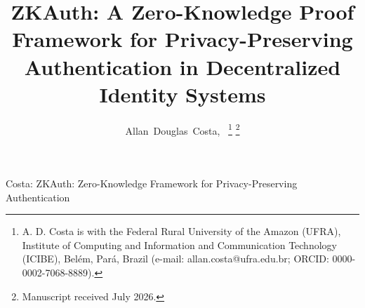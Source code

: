 \documentclass[journal,12pt,onecolumn]{IEEEtran}
\begin{document}

\title{ZKAuth: A Zero-Knowledge Proof Framework for
Privacy-Preserving Authentication in Decentralized Identity Systems}

\author{Allan~Douglas~Costa,~%
\thanks{A. D. Costa is with the Federal Rural University of the Amazon
(UFRA), Institute of Computing and Information and Communication
Technology (ICIBE), Bel\'{e}m, Par\'{a}, Brazil (e-mail:
allan.costa@ufra.edu.br; ORCID: 0000-0002-7068-8889).}%
\thanks{Manuscript received July 2026.}}

%
{Costa: ZKAuth: Zero-Knowledge Framework for Privacy-Preserving Authentication}

\maketitle
\end{document}
